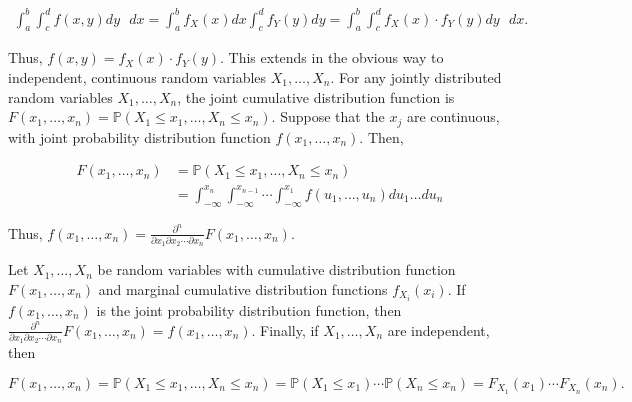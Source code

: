 \documentclass[12pt]{article}
\newcommand{\prob}[1]{\mathbb{P}(#1)}
\newcommand{\nspace}{\vspace*{.5cm}}
\newcommand{\nline}{\nspace \noindent}
\begin{document}
\begin{align*}
\int_{a}^{b} \int_{c}^{d} f(x,y) dy \text{ } dx = \int_{a}^{b} f_X(x) dx \int_{c}^{d} f_Y(y) dy = \int_{a}^{b} \int_{c}^{d} f_X(x) \cdot f_Y(y) dy \text{ } dx.
\end{align*}

\noindent
Thus, $f(x,y) = f_X(x) \cdot f_Y(y)$. This extends in the obvious way to independent, continuous random variables $X_1, \ldots, X_n$. For any jointly distributed random variables $X_1, \ldots, X_n$, the joint cumulative distribution function is $F(x_1, \ldots, x_n) = \prob{X_1 \leq x_1, \ldots, X_n \leq x_n}$. Suppose that the $x_j$ are continuous, with joint probability distribution function $f(x_1, \ldots, x_n)$. Then, 

\begin{align*}
F(x_1, \ldots, x_n) &= \prob{X_1 \leq x_1, \ldots, X_n \leq x_n} \\
&= \int_{- \infty}^{x_n} \int_{- \infty}^{x_{n-1}} \cdots \int_{- \infty}^{x_{1}} f(u_1, \ldots, u_n) du_1 \ldots du_n
\end{align*}

\noindent
Thus, $f(x_1, \ldots, x_n) = \frac{\partial^n}{\partial x_1 \partial x_2 \cdots \partial x_n} F(x_1, \ldots, x_n)$.

\nline
Let $X_1, \ldots, X_n$ be random variables with cumulative distribution function $F(x_1, \ldots, x_n)$ and marginal cumulative distribution functions $f_{X_i} (x_i)$. If $f(x_1, \ldots, x_n)$ is the joint probability distribution function, then $\frac{\partial^n}{\partial x_1 \partial x_2 \cdots \partial x_n} F(x_1, \ldots, x_n) = f(x_1, \ldots, x_n)$. Finally, if $X_1, \ldots, X_n$ are independent, then 

\begin{equation*}
F(x_1, \ldots, x_n) = \prob{X_1 \leq x_1, \ldots, X_n \leq x_n} = \prob{X_1 \leq x_1} \cdots \prob{X_n \leq x_n} = F_{X_1} (x_1) \cdots F_{X_n} (x_n).
\end{equation*}
\end{document}
